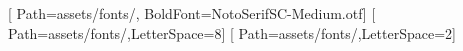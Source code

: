 [
  Path=assets/fonts/,
  BoldFont=NotoSerifSC-Medium.otf]
\newCJKfontfamily{}[
  Path=assets/fonts/,LetterSpace=8]
\newCJKfontfamily{}[
  Path=assets/fonts/,LetterSpace=2]
\renewcommand{\namefont}{\paperfont\variantNameCJKfont}
\renewcommand{\sectionfont}{\headingfont\variantSectionCJKfont}
